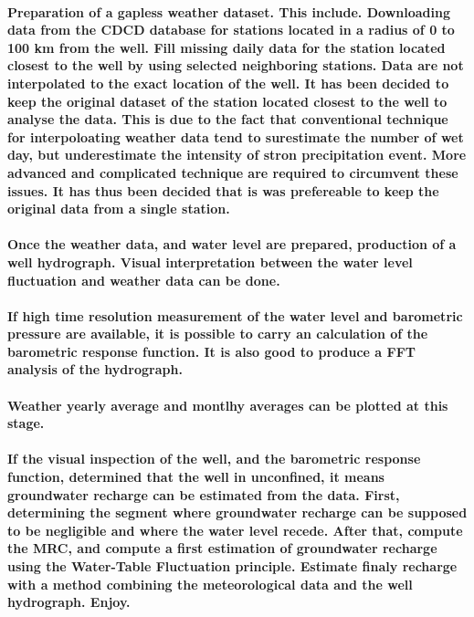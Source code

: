 \documentclass[10pt, letterpaper, fleqn]{report}
\begin{document}
\paragraph{Preparation of a gapless weather dataset. This include. Downloading data from the CDCD database for stations located in a radius of 0 to 100 km from the well. Fill missing daily data for the station located closest to the well by using selected neighboring stations. Data are not interpolated to the exact location of the well. It has been decided to keep the original dataset of the station located closest to the well to analyse the data. This is due to the fact that conventional technique for interpoloating weather data tend to surestimate the number of wet day, but underestimate the intensity of stron precipitation event. More advanced and complicated technique are required to circumvent these issues. It has thus been decided that is was prefereable to keep the original data from a single station.}
\paragraph{Once the weather data, and water level are prepared, production of a well hydrograph. Visual interpretation between the water level  fluctuation and weather data can be done. }
\paragraph{If high time resolution measurement of the water level and barometric pressure are available, it is possible to carry an calculation of the barometric response function. It is also good to produce a FFT analysis of the hydrograph. }
\paragraph{Weather yearly average and montlhy averages can be plotted at this stage.}
\paragraph{If the visual inspection of the well, and the barometric response function, determined that the well in unconfined, it means groundwater recharge can be estimated from the data. First, determining the segment where groundwater recharge can be supposed to be negligible and where the water level recede. After that, compute the MRC, and compute a first estimation of groundwater recharge using the Water-Table Fluctuation principle. Estimate finaly recharge with a method combining the meteorological data and the well hydrograph. Enjoy.}
\end{document}
